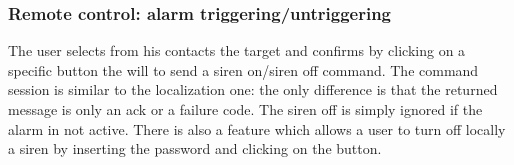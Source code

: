 \subsubsection{Remote control: alarm triggering/untriggering}
The user selects from his contacts the target and confirms by clicking on a specific button the will to send a siren on/siren off command. The command session is similar to the localization one: the only difference is that the returned message is only an ack or a failure code. The siren off is simply ignored if the alarm in not active. There is also a feature which allows a user to turn off locally a siren by inserting the password and clicking on the button.